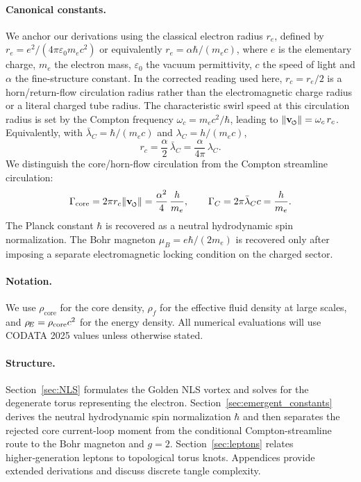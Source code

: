 \documentclass[11pt]{article}
\newcommand{\vnorm}{\lVert \mathbf{v}_{\mkern-2mu\scriptscriptstyle\boldsymbol{\circlearrowleft}} \rVert}  %
\newcommand{\rhoF}{\rho_{\!f}}\newcommand{\rhof}{\rho_{\!f}}     %
\newcommand{\rc}{r_c}                                    %
\newcommand{\rhocore}{\rho_{\text{core}}}
\newcommand{\GammaCore}{\Gamma_{\rm core}}                    %
\newcommand{\GammaC}{\Gamma_C}                                %
\newcommand{\lambdabarC}{\bar{\lambda}_C}
\begin{document}
\paragraph{Canonical constants.}  We anchor our derivations using the classical electron radius $r_e$, defined by $r_e = e^2/(4\pi\varepsilon_0 m_e c^2)$ or equivalently $r_e = \alpha\hbar/(m_e c)$, where $e$ is the elementary charge, $m_e$ the electron mass, $\varepsilon_0$ the vacuum permittivity, $c$ the speed of light and $\alpha$ the fine‑structure constant.  In the corrected reading used here, $\rc = r_e/2$ is a horn/return-flow circulation radius rather than the electromagnetic charge radius or a literal charged tube radius.  The characteristic swirl speed at this circulation radius is set by the Compton frequency $\omega_c = m_e c^2/\hbar$, leading to $\vnorm = \omega_c\,\rc$.  Equivalently, with $\lambdabarC=\hbar/(m_e c)$ and $\lambda_C=h/(m_e c)$,
\begin{equation}
    \rc = \frac{\alpha}{2}\,\lambdabarC = \frac{\alpha}{4\pi}\,\lambda_C .
    \label{eq:rc_compton_relation}
\end{equation}
We distinguish the core/horn-flow circulation from the Compton streamline circulation:
\begin{equation}
    \GammaCore = 2\pi\rc\vnorm
    = \frac{\alpha^2}{4}\,\frac{h}{m_e},
    \qquad
    \GammaC = 2\pi\lambdabarC c = \frac{h}{m_e}.
    \label{eq:gamma_core_vs_compton}
\end{equation}
The Planck constant $\hbar$ is recovered as a neutral hydrodynamic spin normalization.  The Bohr magneton $\mu_B = e\hbar/(2 m_e)$ is recovered only after imposing a separate electromagnetic locking condition on the charged sector.

\paragraph{Notation.}  We use $\rhocore$ for the core density, $\rhoF$ for the effective fluid density at large scales, and $\rhoe = \rhocore c^2$ for the energy density.  All numerical evaluations will use CODATA 2025 values unless otherwise stated.

\paragraph{Structure.}  Section~\ref{sec:NLS} formulates the Golden NLS vortex and solves for the degenerate torus representing the electron.  Section~\ref{sec:emergent_constants} derives the neutral hydrodynamic spin normalization $\hbar$ and then separates the rejected core current-loop moment from the conditional Compton-streamline route to the Bohr magneton and $g=2$.  Section~\ref{sec:leptons} relates higher‑generation leptons to topological torus knots.  Appendices provide extended derivations and discuss discrete tangle complexity.
\end{document}
